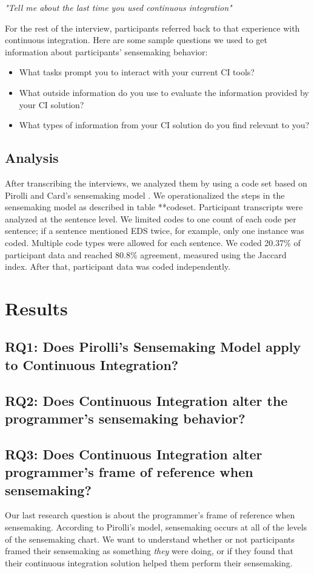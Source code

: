\documentclass{sig-alternate-05-2015}
\begin{document}
\smallskip
\textit{"Tell me about the last time you used continuous integration"}


For the rest of the interview, participants referred back to that experience with continuous integration. Here are some sample questions we used to get information about participants' sensemaking behavior:
\begin{itemize}  
	\item What tasks prompt you to interact with your current CI tools?
	\item What outside information do you use to evaluate the information provided by your CI solution?
	\item What types of information from your CI solution do you find relevant to you? 
\end{itemize}
\subsection{Analysis}
After transcribing the interviews, we analyzed them by using a code set based on Pirolli and Card's sensemaking model \cite{pirolli:sensemaking}. We operationalized the steps in the sensemaking model as described in table **codeset. Participant transcripts were analyzed at the sentence level. We limited codes to one count of each code per sentence; if a sentence mentioned EDS twice, for example, only one instance was coded. Multiple code types were allowed for each sentence. We coded 20.37\% of participant data and reached 80.8\% agreement, measured using the Jaccard index. After that, participant data was coded independently.

\section{Results}

\subsection{RQ1:  Does Pirolli's Sensemaking Model apply to Continuous Integration?}
\subsection{RQ2: Does Continuous Integration alter the programmer's sensemaking behavior?}
\subsection{RQ3: Does Continuous Integration alter programmer's frame of reference when sensemaking?}
Our last research question is about the programmer's frame of reference when sensemaking. According to Pirolli's model, sensemaking occurs at all of the levels of the sensemaking chart. We want to understand whether or not participants framed their sensemaking as something \textit{they} were doing, or if they found that their continuous integration solution helped them perform their sensemaking.
\end{document}
